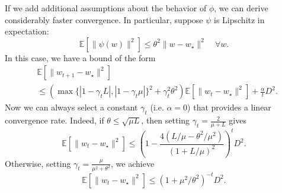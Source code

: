 \begin{enumerate}
	
	If we add additional assumptions about the behavior of $\phi$, we can derive considerably faster convergence.
	In particular, suppose $\psi$ is Lipschitz in expectation:
	\begin{equation}
		\mathbb{E} \left[ \|\psi(w)\|^2 \right] \leq \theta^2 \|w-w_\star\|^2 \quad \forall w.
	\end{equation}
	In this case, we have a bound of the form
	\begin{equation}
		\begin{split}
			&\mathbb{E}\left[\|w_{t+1}-w_\star\|^2 \right]\\
			&\leq \left( \max\{ |1-\gamma_t L|,|1-\gamma_t \mu|  \}^2+\gamma_t^2 \theta^2 \right) \mathbb{E}\left[\|w_t-w_\star\|^2 \right]
			+\frac{\alpha}{t}D^2.
		\end{split}
	\end{equation}
	Now we can always select a constant $\gamma_t$ (i.e. $\alpha=0$) that provides a linear convergence rate.
	Indeed, if $\theta \le \sqrt{\mu L}$, then setting $\gamma_t=\frac{2}{\mu+L}$ gives
	\begin{equation}
		\mathbb{E}\left[\|w_{t}-w_\star\|^2 \right]
		\leq \left( 1-\frac{4(L/\mu -\theta^2/\mu^2)}{(1+L/\mu)^2} \right)^t D^2.
	\end{equation}
	Otherwise, setting $\gamma_t=\frac{\mu}{\mu^2 + \theta^2}$, we achieve
	\begin{equation}
		\mathbb{E}\left[\|w_{t}-w_\star\|^2 \right]
		\leq \left( 1+\mu^2/\theta^2 \right)^{-t} D^2.
	\end{equation}
\end{enumerate}

